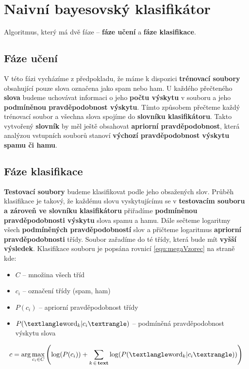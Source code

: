 \documentclass[12pt]{report}
\newcommand\la{\textlangle}  					%
\newcommand\ra{\textrangle}						%
\begin{document}
	\section{Naivní bayesovský klasifikátor}
	Algoritmus, který má dvě fáze – \textbf{fáze učení} a \textbf{fáze klasifikace}.
	
		\subsection{Fáze učení}
		V této fázi vycházíme z předpokladu, že máme k dispozici \textbf{trénovací soubory} obsahující pouze slova označena jako spam nebo ham. U každého přečteného \textbf{slova} budeme uchovávat informaci o jeho \textbf{počtu výskytu} v souboru a jeho \textbf{podmíněnou pravděpodobnost výskytu}. Tímto způsobem přečteme každý trénovací soubor a všechna slova spojíme do \textbf{slovníku klasifikátoru}. Takto vytvořený \textbf{slovník} by měl ještě obsahovat \textbf{apriorní pravděpodobnost}, která analýzou vstupních souborů stanoví \textbf{výchozí pravděpodobnost výskytu spamu či hamu}.
	
		\subsection{Fáze klasifikace}
		\textbf{Testovací soubory} budeme klasifikovat podle jeho obsažených slov. Průběh klasifikace je takový, že každému slovu vyskytujícímu se v \textbf{testovacím souboru a zároveň ve slovníku klasifikátoru} přiřadíme \textbf{podmíněnou pravděpodobnosti výskytu} slova spamu a hamu. Dále sečteme logaritmy všech \textbf{podmíněných pravděpodobností} slov a přičteme logaritmus \textbf{apriorní pravděpodobnosti} třídy. Soubor zařadíme do té třídy, která bude mít \textbf{vyšší výsledek}. Klasifikace souboru je popsána rovnicí \ref{equ:megaVzorec} na straně \pageref{equ:megaVzorec} kde:
		\begin{itemize}
			\item $C$ – množina všech tříd
			\item $c_i$ – označení třídy (spam, ham)
			\item $P(c_i)$ – apriorní pravděpodobnost třídy
			\item $P(\la \text{word}_k | c_i \ra)$ – podmíněná pravděpodobnost výskytu slova 
		\end{itemize}
	
		\begin{equation}
			c = \arg\max_{c_i \in C}\left( \log (P(c_i)) + \sum_{k\,\in\,\text{\bfseries text}} \log (P(\la \text{word}_k | c_i \ra))\right)
			\label{equ:megaVzorec}
		\end{equation}
			
\end{document}
